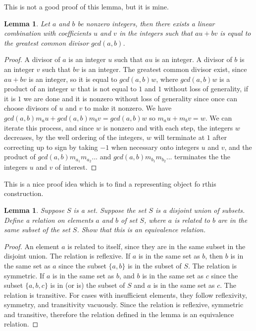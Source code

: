 \documentclass[10pt,twocolumn]{article}
\newtheorem{lemma}[theorem]{Lemma}
\begin{document}
This is not a good proof of this lemma, but it is mine.

\begin{lemma}
    Let $a$ and $b$ be nonzero integers, then there exists a linear combination with coefficients $u$ and $v$ in the integers such that
    $au + bv$ is equal to the greatest common divisor $gcd(a,b)$.
\end{lemma}

\begin{proof}
    A divisor of $a$ is an integer $u$ such that $au$ is an integer.
    A divisor of $b$ is an integer $v$ such that $bv$ is an integer.
    The greatest common divisor exist, since $au + bv$ is an integer, so it is equal to $gcd(a,b)w$, where $gcd(a,b)w$ is 
    a product of an integer $w$ that is not equal to $1$ and $1$ without loss of generality, if it is $1$ we are done and it is
    nonzero without loss of generality since once can choose divisors of $u$ and $v$ to make it nonzero.
    We have $gcd(a,b) m_a u + gcd(a,b) m_b v = gcd(a,b) w$ so $m_a u + m_b v = w$. We can iterate this process, and since $w$ is nonzero and with each step, the integers $w$ decreases, by the well ordering of the integers, $w$ will terminate at $1$ after correcting up to sign by taking $-1$ when necessary onto integers $u$ and $v$, and the product of $gcd(a,b) m_{a_1} m_{a_2}...$ and $gcd(a,b) m_{b_1} m_{b_2}...$ terminates the the integers $u$ and $v$ of interest.
\end{proof}

This is a nice proof idea which is to find a representing object fo rthis construction.

\begin{lemma}
    Suppose $S$ is a set.
    Suppose the set $S$ is a disjoint union of subsets.
    Define a relation on elements $a$ and $b$ of set $S$, where $a$ is related to $b$ are in the same subset of the set $S$.
    Show that this is an equivalence relation. 
\end{lemma}

\begin{proof}
    An element $a$ is related to itself, since they are in the same subset in the disjoint union. The relation is reflexive.
    If $a$ is in the same set as $b$, then $b$ is in the same set as $a$ since the subset $\{a,b\}$ is in the subset of $S$. The relation is symmetric.
    If $a$ is in the same set as $b$, and $b$ is in the same set as $c$ since the subset $\{a,b,c\}$ is in (or is) the subset of $S$ and $a$ is in the same set as $c$. The relation is transitive.
    For cases with insufficient elements, they follow reflexivity, symmetry, and transitivity vacuously.
    Since the relation is reflexive, symmetric and transitive, therefore the relation defined in the lemma is an equivalence relation.
\end{proof}
\end{document}
